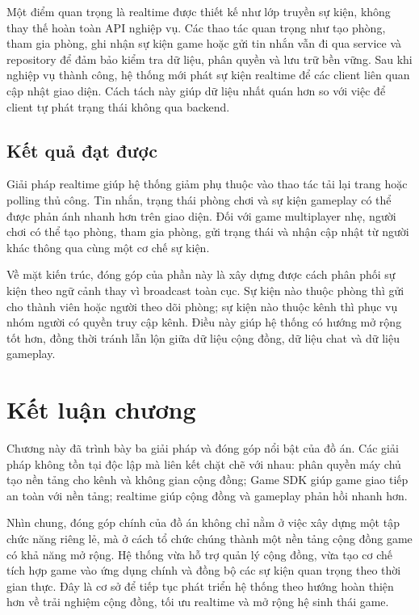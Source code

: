 Một điểm quan trọng là realtime được thiết kế như lớp truyền sự kiện, không thay thế hoàn toàn API nghiệp vụ. Các thao tác quan trọng như tạo phòng, tham gia phòng, ghi nhận sự kiện game hoặc gửi tin nhắn vẫn đi qua service và repository để đảm bảo kiểm tra dữ liệu, phân quyền và lưu trữ bền vững. Sau khi nghiệp vụ thành công, hệ thống mới phát sự kiện realtime để các client liên quan cập nhật giao diện. Cách tách này giúp dữ liệu nhất quán hơn so với việc để client tự phát trạng thái không qua backend.

\subsection{Kết quả đạt được}
\label{subsection:5.3.3}

Giải pháp realtime giúp hệ thống giảm phụ thuộc vào thao tác tải lại trang hoặc polling thủ công. Tin nhắn, trạng thái phòng chơi và sự kiện gameplay có thể được phản ánh nhanh hơn trên giao diện. Đối với game multiplayer nhẹ, người chơi có thể tạo phòng, tham gia phòng, gửi trạng thái và nhận cập nhật từ người khác thông qua cùng một cơ chế sự kiện.

Về mặt kiến trúc, đóng góp của phần này là xây dựng được cách phân phối sự kiện theo ngữ cảnh thay vì broadcast toàn cục. Sự kiện nào thuộc phòng thì gửi cho thành viên hoặc người theo dõi phòng; sự kiện nào thuộc kênh thì phục vụ nhóm người có quyền truy cập kênh. Điều này giúp hệ thống có hướng mở rộng tốt hơn, đồng thời tránh lẫn lộn giữa dữ liệu cộng đồng, dữ liệu chat và dữ liệu gameplay.

\section{Kết luận chương}
\label{section:5.4}

Chương này đã trình bày ba giải pháp và đóng góp nổi bật của đồ án. Các giải pháp không tồn tại độc lập mà liên kết chặt chẽ với nhau: phân quyền máy chủ tạo nền tảng cho kênh và không gian cộng đồng; Game SDK giúp game giao tiếp an toàn với nền tảng; realtime giúp cộng đồng và gameplay phản hồi nhanh hơn.

Nhìn chung, đóng góp chính của đồ án không chỉ nằm ở việc xây dựng một tập chức năng riêng lẻ, mà ở cách tổ chức chúng thành một nền tảng cộng đồng game có khả năng mở rộng. Hệ thống vừa hỗ trợ quản lý cộng đồng, vừa tạo cơ chế tích hợp game vào ứng dụng chính và đồng bộ các sự kiện quan trọng theo thời gian thực. Đây là cơ sở để tiếp tục phát triển hệ thống theo hướng hoàn thiện hơn về trải nghiệm cộng đồng, tối ưu realtime và mở rộng hệ sinh thái game.
